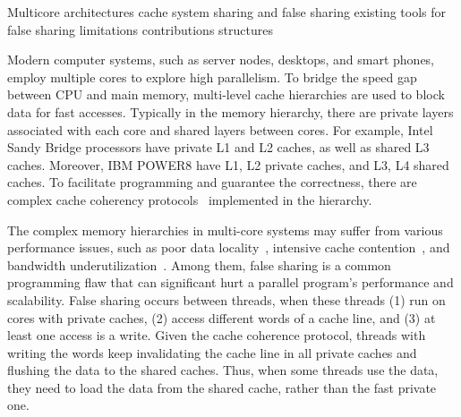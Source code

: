 Multicore architectures 
cache system
sharing and false sharing
existing tools for false sharing
limitations
contributions
structures

Modern computer systems, such as server nodes, desktops, and smart phones, employ multiple cores to explore high parallelism. To bridge the speed gap between CPU and main memory, multi-level cache hierarchies are used to block data for fast accesses. Typically in the memory hierarchy, there are private layers associated with each core and shared layers between cores. For example, Intel Sandy Bridge processors have private L1 and L2 caches, as well as shared L3 caches. Moreover, IBM POWER8 have L1, L2 private caches, and L3, L4 shared caches.
To facilitate programming and guarantee the correctness, there are complex cache coherency protocols~\cite{} implemented in the hierarchy.

The complex memory hierarchies in multi-core systems may suffer from various performance issues, such as poor data locality~\cite{}, intensive cache contention~\cite{}, and bandwidth underutilization~\cite{}. Among them, false sharing is a common programming flaw that can significant hurt a parallel program's performance and scalability. False sharing occurs between threads, when these threads (1) run on cores with private caches, (2) access different words of a cache line, and (3) at least one access is a write. Given the cache coherence protocol, threads with writing the words keep invalidating the cache line in all private caches and flushing the data to the shared caches. Thus, when some threads use the data, they need to load the data from the shared cache, rather than the fast private one.




